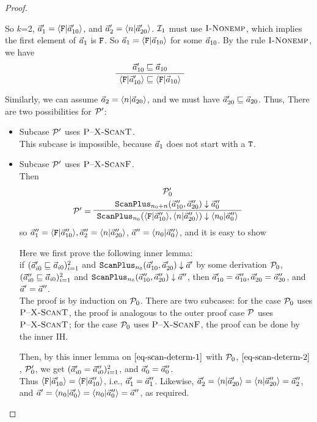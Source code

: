 \begin{proof}
\begin{itemize}
		So $k$=2, $\a_1' = \<\F|\a'_{10} \'>$, and $\a_2' = \<n|\a'_{20}\'>$. 
		$\mathcal{I}_{1}$ must use $\textsc{I-Nonemp}$, which implies the first element of $\vec a_1$ is $\mathtt{F}$. So $\a_1 = \< \F | \a_{10}\'>$ for some $\vec a_{10}$. 
		By the rule $\textsc{I-Nonemp}$, we have
			$$\PT{
				\AC{\a'_{10} \prefix \a_{10}}
				\UC{\<\F|\a'_{10} \'> \prefix \< \F | \a_{10}\'>}
			}$$
				
		Similarly, we can assume  $\a_2 = \<n |\a_{20} \'>$, and we must have $\vec a'_{20} \sqsubseteq \vec a_{20}$.
		Thus, 
		There are two possibilities for $\mathcal{P}'$:
		\begin{itemize}
			\item Subcase $\mathcal{P}'$ uses $\textsc{P--X-ScanT}$.\\
			This subcase is impossible, because $\vec a_1$ does not start with a $\mathtt{T}$. 
			
			\item Subcase $\mathcal{P}'$ uses $\textsc{P--X-ScanF}$.\\
			Then	
			$$\PT{\UCN{\MP_0'}{\blockf{\scan_{n_0+n}}{\a''_{10},\a''_{20}}{\a''_0}}
				\LeLa{\MP' = }
				\UC{\blockf{\scan_{n_0}}{\<\F|\a''_{10} \'>, \<n|\a''_{20}\'>}{\<n_0|\a''_0\'>}}
			}$$
			so $\a_1'' =  \<\F|\a''_{10} \'>, \a_2'' = \<n|\a''_{20}\'>$, $\a'' = \<n_0|\a''_0\'>$, 
			and it is easy to show  
			
			Here we first prove the following inner lemma: \\		
			if $(\vec a'_{i0} \sqsubseteq \vec a_{i0} )^2_{i=1}$ and $\mathtt{ScanPlus}_{n_0}(\vec a'_{10},\vec a'_{20}) \downarrow \vec a'$ by some derivation $\mathcal{P}_0$,
		    $(\vec a''_{i0} \sqsubseteq \vec a_{i0} )^2_{i=1}$ and $\mathtt{ScanPlus}_{n_0}(\vec a''_{10},\vec a''_{20}) \downarrow \vec a''$,
			then $\vec a'_{10} = \vec a''_{10}, \vec a'_{20} = \vec a''_{20}$,  and $\vec a' = \vec a''$. \\
			The proof is by induction on $\mathcal{P}_0$.  There are two subcases:
			for the case $\mathcal{P}_0$ uses $\textsc{P--X-ScanT}$, the proof is analogous to the outer proof case $\mathcal{P}$ uses  $\textsc{P--X-ScanT}$; for the case $\mathcal{P}_0$ uses $\textsc{P--X-ScanF}$, the proof can be done by the inner IH. 	
			
			Then, by this inner lemma on $\eqref{eq-scan-determ-1}$ with $\mathcal{P}_0$, 
			$\eqref{eq-scan-determ-2}$, $\mathcal{P}_0'$, we get
			$(\vec a'_{i0} = \vec a''_{i0})^2_{i=1}$, and $\vec a'_0 = \vec a''_0$. \\
			Thus $\< \F |\a'_{10} \'> = \<\F | \a''_{10} \'>$, i.e., $\vec a'_1 = \vec a''_1$. 
			Likewise, $\a'_2 = \<n|\a'_{20}\'> = \<n|\a''_{20}\'> = \a''_2$, and  $\a' = \<n_0|\a'_0\'> = \<n_0|\a''_0\'> = \a''$, as required. 
			
		\end{itemize}
		
	\end{itemize}
\end{proof}


